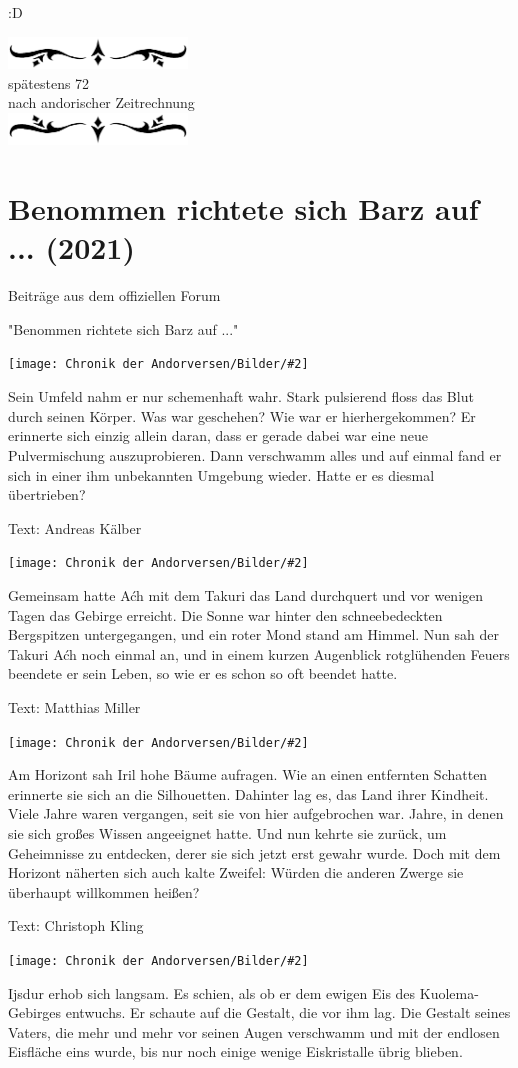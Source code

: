 \documentclass[10pt, a4paper, oneside]{book}
\newcommand{\fillbreak}{\vspace*{\fill}\columnbreak}
\newcommand{\storytext}[1]{%
    \section{#1}%
    \label{Storytext: #1}%
}
\newcommand{\bildmitts}[2][height=0.32\textwidth,width=0.48\textwidth,keepaspectratio]{%
    \begin{center}
        \texttt{[image: Chronik der Andorversen/Bilder/\#2]}
    \end{center}
}
\newcommand{\az}[1]{%
    \begin{center}
        \includegraphics[width=180px]{Chronik der Andorversen/verzierung1.png}\\
        {\Huge #1} \\
        {nach andorischer Zeitrechnung}\\
        \includegraphics[width=180px]{Chronik der Andorversen/verzierung2.png}
    \end{center}
    \extramarks{}{#1 a.Z.}
}
\begin{document}
\begin{multicols}{2}
:D








\fillbreak
\az{spätestens 72}
\storytext{Benommen richtete sich Barz auf ... (2021)}


\begin{center}
    Beiträge aus dem offiziellen Forum

    "Benommen richtete sich Barz auf ..."
\end{center}

\bildmitts{MH Preview Barz.jpeg}

Sein Umfeld nahm er nur schemenhaft wahr. Stark pulsierend floss das Blut durch seinen Körper. Was war geschehen? Wie war er hierhergekommen? Er erinnerte sich einzig allein daran, dass er gerade dabei war eine neue Pulvermischung auszuprobieren. Dann verschwamm alles und auf einmal fand er sich in einer ihm unbekannten Umgebung wieder. Hatte er es diesmal übertrieben?

Text: Andreas Kälber\bigskip

\bildmitts{MH Preview Ach.jpeg}

Gemeinsam hatte Aćh mit dem Takuri das Land durchquert und vor wenigen Tagen das Gebirge erreicht. Die Sonne war hinter den schneebedeckten Bergspitzen untergegangen, und ein roter Mond stand am Himmel. Nun sah der Takuri Aćh noch einmal an, und in einem kurzen Augenblick rotglühenden Feuers beendete er sein Leben, so wie er es schon so oft beendet hatte.

Text: Matthias Miller\bigskip

\bildmitts{MH Preview Iril.jpeg}

Am Horizont sah Iril hohe Bäume aufragen. Wie an einen entfernten Schatten erinnerte sie sich an die Silhouetten. Dahinter lag es, das Land ihrer Kindheit. Viele Jahre waren vergangen, seit sie von hier aufgebrochen war. Jahre, in denen sie sich großes Wissen angeeignet hatte. Und nun kehrte sie zurück, um Geheimnisse zu entdecken, derer sie sich jetzt erst gewahr wurde. Doch mit dem Horizont näherten sich auch kalte Zweifel: Würden die anderen Zwerge sie überhaupt willkommen heißen?

Text: Christoph Kling\bigskip

\bildmitts{MH Preview Ijsdur.jpeg}

Ijsdur erhob sich langsam. Es schien, als ob er dem ewigen Eis des Kuolema-Gebirges entwuchs. Er schaute auf die Gestalt, die vor ihm lag. Die Gestalt seines Vaters, die mehr und mehr vor seinen Augen verschwamm und mit der endlosen Eisfläche eins wurde, bis nur noch einige wenige Eiskristalle übrig blieben.


\end{multicols}
\end{document}

